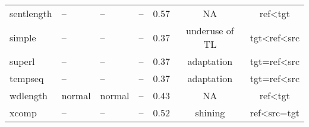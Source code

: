 \begin{longtable}{l|p{2cm}p{2cm}p{1.5cm}ccc}
	sentlength    & --     & --     & --    & 0.57 & NA  & ref\textless{}tgt \\
	simple        & --     & --     & --    & 0.37 & underuse of TL  & tgt\textless{}ref\textless{}src \\
	superl        & --     & --     & --    & 0.37 & adaptation     & tgt=ref\textless{}src           \\
	tempseq       & --     & --     & --    & 0.37 & adaptation     & tgt=ref\textless{}src           \\
	wdlength      & normal & normal & --    & 0.43 & NA  & ref\textless{}tgt \\
	xcomp         & --     & --     & --    & 0.52 & shining        & ref\textless{}src=tgt			\\
	\bottomrule

\end{longtable}

